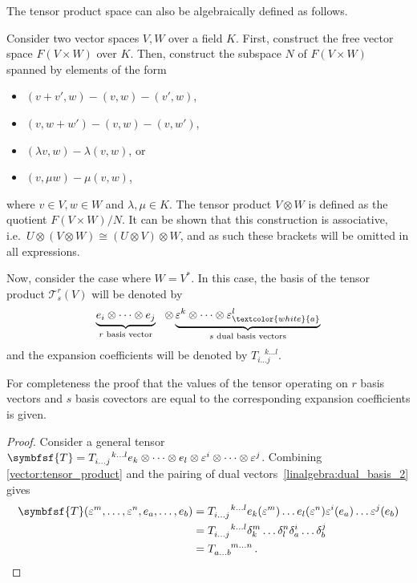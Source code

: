     The tensor product space can also be algebraically defined as follows.
    \begin{adefinition}
        Consider two vector spaces $V,W$ over a field $K$. First, construct the free vector space $F(V\times W)$ over $K$. Then, construct the subspace $N$ of $F(V\times W)$ spanned by elements of the form
        \begin{itemize}
            \item $(v+v',w) - (v,w) - (v',w)$,
            \item $(v,w+w') - (v,w) - (v,w')$,
            \item $(\lambda v,w) - \lambda(v,w)$, or
            \item $(v,\mu w) - \mu(v,w)$,
        \end{itemize}
        where $v\in V,w\in W$ and $\lambda,\mu\in K$. The tensor product $V\otimes W$ is defined as the quotient $F(V\times W)/N$. It can be shown that this construction is associative, i.e.~$U\otimes(V\otimes W)\cong(U\otimes V)\otimes W$, and as such these brackets will be omitted in all expressions.

        Now, consider the case where $W=V^*$. In this case, the basis of the tensor product $\mathcal{T}^r_s(V)$ will be denoted by
        \[\underbrace{e_i\otimes\cdots\otimes e_j}_{r\text{ basis vector}}\ \ \otimes\underbrace{\varepsilon^k\otimes\cdots\otimes \varepsilon^l_{\textcolor{white}{a}}}_{s\text{ dual basis vectors}}\]
        and the expansion coefficients will be denoted by $T_{i\ldots j}^{\ \ \ \ k\ldots l}$.
    \end{adefinition}


    For completeness the proof that the values of the tensor operating on $r$ basis vectors and $s$ basis covectors are equal to the corresponding expansion coefficients is given.
    \begin{mdframed}[roundcorner=10pt, linecolor=blue, linewidth=1pt]
        \begin{proof}
            Consider a general tensor $\symbfsf{T} = T_{i\ldots j}^{\ \ \ \ k\ldots l}e_k\otimes\cdots\otimes e_l\otimes\varepsilon^i\otimes\cdots\otimes\varepsilon^j$. Combining \cref{vector:tensor_product} and the pairing of dual vectors~\eqref{linalgebra:dual_basis_2} gives
            \begin{align*}
                \symbfsf{T}(\varepsilon^m,\ldots,\varepsilon^n,e_a,\ldots,e_b) &= T_{i\ldots j}^{\ \ \ \ k\ldots l}e_k(\varepsilon^m)\ldots e_l(\varepsilon^n)\varepsilon^i(e_a)\ldots\varepsilon^j(e_b)\\
                &= T_{i\ldots j}^{\ \ \ \ k\ldots l}\delta_k^m\ldots\delta_l^n\delta_a^i\ldots\delta_b^j\\
                &= T_{a\ldots b}^{\ \ \ \ m\ldots n}\,.
            \end{align*}$ $
        \end{proof}
    \end{mdframed}

